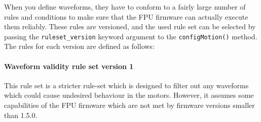 \documentclass[fontsize=12,a4paper]{scrreprt}
\begin{document}
When you define waveforms, they have to conform to a fairly large
number of rules and conditions to make sure that the FPU firmware can
actually execute them reliably. These rules are versioned, and the
used rule set can be selected by passing the \texttt{ruleset\_version}
keyword argument to the \texttt{configMotion()} method.  The rules for
each version are defined as follows:

\paragraph{Waveform validity rule set version 1}

This rule set is a stricter rule-set which is designed to filter out
any waveforms which could cause undesired behaviour in the motors.
However, it assumes some capabilities of the FPU firmware which are
not met by firmware versions smaller than 1.5.0.
\end{document}
